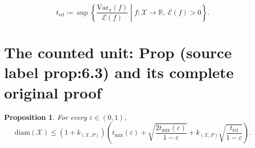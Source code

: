\documentclass[10pt,a4paper]{amsart}
\theoremstyle{plain}
\newtheorem{Prop}[Thm]{Proposition}
\theoremstyle{definition}
\begin{document}
\begin{equation}\label{eq:def-relax} 
t_{\mathrm{rel}} \coloneqq  \sup \left\{ \frac{\mathrm{Var}_\pi(f)}{\mathcal{E}(f)} \middle| f : \mathcal{X} \to \mathbb{R},\ \mathcal{E}(f) > 0 \right\}. 
\end{equation}


\section{The counted unit: Prop (source label prop:6.3) and its complete original proof}

\begin{Prop}\label{prop:6.3}
For every $\varepsilon \in (0,1)$,
\[ \mathrm{diam}(\mathcal{X}) \le (1+k_{(\mathcal{X}, P)})\left(t_{\mathrm{mix}}(\varepsilon)+\sqrt{\frac{2t_{\mathrm{mix}}(\varepsilon)}{1-\varepsilon}}+k_{(\mathcal{X}, P)}\sqrt{\frac{t_{\mathrm{rel}}}{1-\varepsilon}}\right).\]
\end{Prop}
\end{document}
